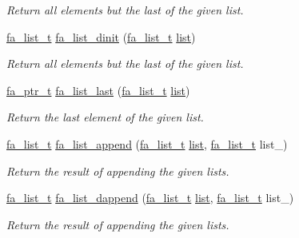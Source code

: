 \begin{DoxyCompactItemize}
\begin{DoxyCompactList}\small\item\em Return all elements but the last of the given list. \end{DoxyCompactList}\item 
\hyperlink{group___fa_list_ga35ecb12ab934ded0cce0bcf28e3bc5d2}{fa\-\_\-list\-\_\-t} \hyperlink{group___fa_list_ga79588d4812728fcfd260d37c2eed38a5}{fa\-\_\-list\-\_\-dinit} (\hyperlink{group___fa_list_ga35ecb12ab934ded0cce0bcf28e3bc5d2}{fa\-\_\-list\-\_\-t} \hyperlink{literals_8h_a4ddd63dfcfec2b4d5741a56aa6003c76}{list})
\begin{DoxyCompactList}\small\item\em Return all elements but the last of the given list. \end{DoxyCompactList}\item 
\hyperlink{group___fa_ga915ddeae99ad7568b273d2b876425197}{fa\-\_\-ptr\-\_\-t} \hyperlink{group___fa_list_ga8e381af7983cac00ff95ad1f468dd90a}{fa\-\_\-list\-\_\-last} (\hyperlink{group___fa_list_ga35ecb12ab934ded0cce0bcf28e3bc5d2}{fa\-\_\-list\-\_\-t} \hyperlink{literals_8h_a4ddd63dfcfec2b4d5741a56aa6003c76}{list})
\begin{DoxyCompactList}\small\item\em Return the last element of the given list. \end{DoxyCompactList}\item 
\hyperlink{group___fa_list_ga35ecb12ab934ded0cce0bcf28e3bc5d2}{fa\-\_\-list\-\_\-t} \hyperlink{group___fa_list_ga5c51602ab144ef57ec504d2128066992}{fa\-\_\-list\-\_\-append} (\hyperlink{group___fa_list_ga35ecb12ab934ded0cce0bcf28e3bc5d2}{fa\-\_\-list\-\_\-t} \hyperlink{literals_8h_a4ddd63dfcfec2b4d5741a56aa6003c76}{list}, \hyperlink{group___fa_list_ga35ecb12ab934ded0cce0bcf28e3bc5d2}{fa\-\_\-list\-\_\-t} list\-\_\-)
\begin{DoxyCompactList}\small\item\em Return the result of appending the given lists. \end{DoxyCompactList}\item 
\hyperlink{group___fa_list_ga35ecb12ab934ded0cce0bcf28e3bc5d2}{fa\-\_\-list\-\_\-t} \hyperlink{group___fa_list_gae17a6b6ead9c469d08f19c1a80746462}{fa\-\_\-list\-\_\-dappend} (\hyperlink{group___fa_list_ga35ecb12ab934ded0cce0bcf28e3bc5d2}{fa\-\_\-list\-\_\-t} \hyperlink{literals_8h_a4ddd63dfcfec2b4d5741a56aa6003c76}{list}, \hyperlink{group___fa_list_ga35ecb12ab934ded0cce0bcf28e3bc5d2}{fa\-\_\-list\-\_\-t} list\-\_\-)
\begin{DoxyCompactList}\small\item\em Return the result of appending the given lists. \end{DoxyCompactList}\item 

\end{DoxyCompactItemize}
